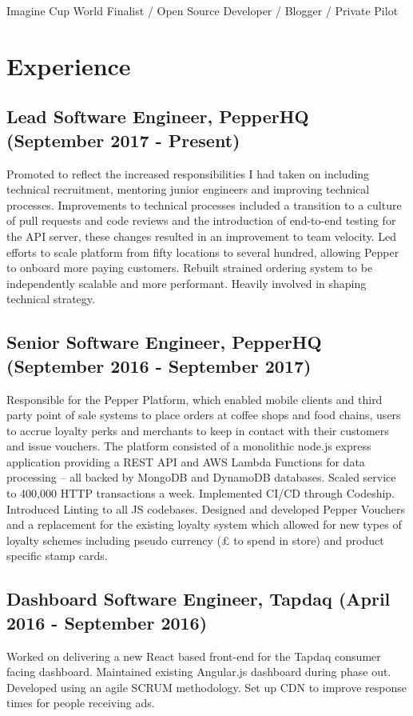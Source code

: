 \documentclass[10pt,letterpaper]{article}
\begin{document}

	\noindent Imagine Cup World Finalist / Open Source Developer / Blogger / Private Pilot

	\noindent\makebox[\linewidth]{\rule{\textwidth}{0.4pt}}
	
	\section*{Experience}
	\subsection*{Lead Software Engineer, PepperHQ \small{(September 2017 - Present)}}
	Promoted to reflect the increased responsibilities I had taken on including technical recruitment, mentoring junior engineers and improving technical processes. Improvements to technical processes included a transition to a culture of pull requests and code reviews and the introduction of end-to-end testing for the API server, these changes resulted in an improvement to team velocity. Led efforts to scale platform from fifty locations to several hundred, allowing Pepper to onboard more paying customers. Rebuilt strained ordering system to be independently scalable and more performant. Heavily involved in shaping technical strategy.
	
	\subsection*{Senior Software Engineer, PepperHQ \small{(September 2016 - September 2017)}}
	Responsible for the Pepper Platform, which enabled mobile clients and third party point of sale systems to place orders at coffee shops and food chains, users to accrue loyalty perks and merchants to keep in contact with their customers and issue vouchers. The platform consisted of a monolithic node.js express application providing a REST API and AWS Lambda Functions for data processing -- all backed by MongoDB and DynamoDB databases. Scaled service to 400,000 HTTP transactions a week. Implemented CI/CD through Codeship. Introduced Linting to all JS codebases. Designed and developed Pepper Vouchers and a replacement for the existing loyalty system which allowed for new types of loyalty schemes including pseudo currency (£ to spend in store) and product specific stamp cards.
	
	\subsection*{Dashboard Software Engineer, Tapdaq \small{(April 2016 - September 2016)}}
	Worked on delivering a new React based front-end for the Tapdaq consumer facing dashboard. Maintained existing Angular.js dashboard during phase out. Developed using an agile SCRUM methodology. Set up CDN to improve response times for people receiving ads.
	
\end{document}
